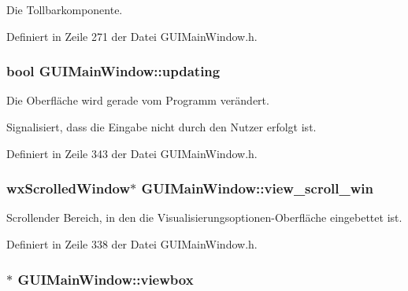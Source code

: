 Die Tollbarkomponente. 



Definiert in Zeile 271 der Datei G\-U\-I\-Main\-Window.\-h.

\hypertarget{classGUIMainWindow_afdc35b04c0fe94e4d0080f659ecbce8c}{
\subsubsection[{updating}]{\setlength{\rightskip}{0pt plus 5cm}bool G\-U\-I\-Main\-Window\-::updating\hspace{0.3cm}{\ttfamily [private]}}}\label{classGUIMainWindow_afdc35b04c0fe94e4d0080f659ecbce8c}


Die Oberfläche wird gerade vom Programm verändert. 

Signalisiert, dass die Eingabe nicht durch den Nutzer erfolgt ist. 

Definiert in Zeile 343 der Datei G\-U\-I\-Main\-Window.\-h.

\hypertarget{classGUIMainWindow_ad440f7451fd3fdabbe48518a89e61e45}{
\subsubsection[{view\-\_\-scroll\-\_\-win}]{\setlength{\rightskip}{0pt plus 5cm}wx\-Scrolled\-Window$\ast$ G\-U\-I\-Main\-Window\-::view\-\_\-scroll\-\_\-win\hspace{0.3cm}{\ttfamily [private]}}}\label{classGUIMainWindow_ad440f7451fd3fdabbe48518a89e61e45}


Scrollender Bereich, in den die Visualisierungsoptionen-\/\-Oberfläche eingebettet ist. 



Definiert in Zeile 338 der Datei G\-U\-I\-Main\-Window.\-h.

\hypertarget{classGUIMainWindow_a3e9a4e301f90e85e97721aa71b197ca8}{
\subsubsection[{viewbox}]{$\ast$ G\-U\-I\-Main\-Window\-::viewbox\hspace{0.3cm}{\ttfamily [private]}}}\label{classGUIMainWindow_a3e9a4e301f90e85e97721aa71b197ca8}


